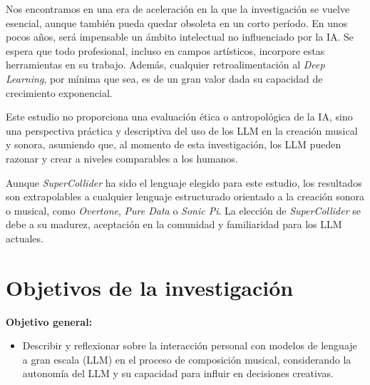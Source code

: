 Nos encontramos en una era de aceleración en la que la investigación se vuelve esencial, aunque también pueda quedar obsoleta en un corto período. En unos pocos años, será impensable un ámbito intelectual no influenciado por la IA. Se espera que todo profesional, incluso en campos artísticos, incorpore estas herramientas en su trabajo. Además, cualquier retroalimentación al \textit{Deep Learning}, por mínima que sea, es de un gran valor dada su capacidad de crecimiento exponencial.

Este estudio no proporciona una evaluación ética o antropológica de la IA, sino una perspectiva práctica y descriptiva del uso de los LLM en la creación musical y sonora, asumiendo que, al momento de esta investigación, los LLM pueden razonar y crear a niveles comparables a los humanos.

Aunque \textit{SuperCollider} ha sido el lenguaje elegido para este estudio, los resultados son extrapolables a cualquier lenguaje estructurado orientado a la creación sonora o musical, como \textit{Overtone}, \textit{Pure Data} o \textit{Sonic Pi}. La elección de \textit{SuperCollider} se debe a su madurez, aceptación en la comunidad y familiaridad para los LLM actuales.


\section{Objetivos de la investigación}

\textbf{Objetivo general:}
\begin{itemize}
    \item Describir y reflexionar sobre la interacción personal con modelos de lenguaje a gran escala (LLM) en el proceso de composición musical, considerando la autonomía del LLM y su capacidad para influir en decisiones creativas.
\end{itemize}

